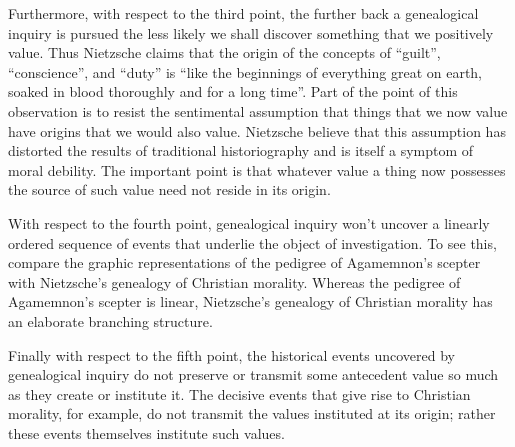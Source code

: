 Furthermore, with respect to the third point, the further back a genealogical inquiry is pursued the less likely we shall discover something that we positively value. Thus Nietzsche claims that the origin of the concepts of ``guilt'', ``conscience'', and ``duty'' is ``like the beginnings of everything great on earth, soaked in blood thoroughly and for a long time''. Part of the point of this observation is to resist the sentimental assumption that things that we now value have origins that we would also value. Nietzsche believe that this assumption has distorted the results of traditional historiography and is itself a symptom of moral debility. The important point is that whatever value a thing now possesses the source of such value need not reside in its origin.

With respect to the fourth point, genealogical inquiry won't uncover a linearly ordered sequence of events that underlie the object of investigation. To see this, compare the graphic representations of the pedigree of Agamemnon's scepter with Nietzsche's genealogy of Christian morality. Whereas the pedigree of Agamemnon's scepter is linear, Nietzsche's genealogy of Christian morality has an elaborate branching structure.

Finally with respect to the fifth point, the historical events uncovered by genealogical inquiry do not preserve or transmit some antecedent value so much as they create or institute it. The decisive events that give rise to Christian morality, for example, do not transmit the values instituted at its origin; rather these events themselves institute such values. \change

